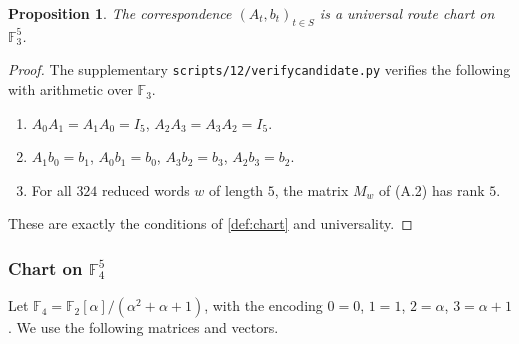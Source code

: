 \documentclass[11pt]{article}
\newtheorem{proposition}[theorem]{Proposition}
\theoremstyle{definition}
\theoremstyle{remark}
\providecommand{\tightlist}{\setlength{\itemsep}{0pt}\setlength{\parskip}{0pt}}
\renewcommand{\_}{\textunderscore\allowbreak}
\begin{document}
\begin{proposition}\label{prop:a10}
The correspondence \((A_t,b_t)_{t\in S}\) is
a universal route chart on \(\mathbb F_3^5\).
\end{proposition}

\begin{proof}
The supplementary
\texttt{scripts/12\_5\_34992/verify\_candidate.py} verifies the
following with arithmetic over \(\mathbb F_3\).

\begin{enumerate}
\def\labelenumi{\arabic{enumi}.}
\tightlist
\item
  \(A_0A_1=A_1A_0=I_5\), \(A_2A_3=A_3A_2=I_5\).
\item
  \(A_1b_0=b_1\), \(A_0b_1=b_0\), \(A_3b_2=b_3\), \(A_2b_3=b_2\).
\item
  For all \(324\) reduced words \(w\) of length \(5\), the matrix
  \(M_w\) of (A.2) has rank \(5\).
\end{enumerate}

These are exactly the conditions of \cref{def:chart} and universality.
\end{proof}

\subsubsection{\texorpdfstring{Chart on
\(\mathbb F_4^5\)}{A.6.2 Chart on \textbackslash mathbb F\_4\^{}5}}\label{a.6.2-chart-on-mathbb-f_45}

Let \(\mathbb F_4=\mathbb F_2[\alpha]/(\alpha^2+\alpha+1)\), with the
encoding \(0=0\), \(1=1\), \(2=\alpha\), \(3=\alpha+1\). We use the
following matrices and vectors.
\end{document}
